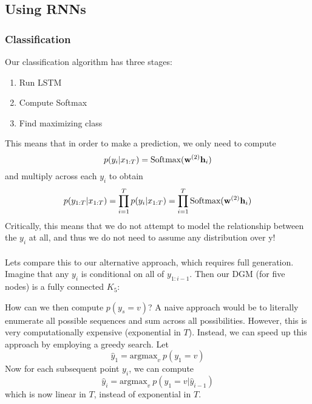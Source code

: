 \documentclass{article}
\begin{document}
\subsection{Using RNNs}
\subsubsection{Classification}
Our classification algorithm has three stages:
\begin{enumerate}
    \item Run LSTM
    \item Compute Softmax   
    \item Find maximizing class
\end{enumerate}


This means that in order to make a prediction, we only need to compute 
$$ p(y_i|x_{1:T}) = \text{Softmax} (\bold{w}^{(2)} \bold{h}_i) $$
and multiply across each $y_i$ to obtain
$$ p(y_{1:T} | x_{1:T}) = \prod_{i=1}^T p(y_i|x_{1:T}) = \prod_{i=1}^T \text{Softmax} (\bold{w}^{(2)} \bold{h}_i) $$ 
Critically, this means that we do not attempt to model the relationship between the $y_i$ at all, and thus we do not need to assume any distribution over y!
\\ \\ \noindent
Lets compare this to our alternative approach, which requires full generation. Imagine that any $y_i$ is conditional on all of $y_{1:i-1}$. Then our DGM (for five nodes) is a fully connected $K_5$:

\begin{center}
\end{center}

How can we then compute $p(y_s = v)$? A naive approach would be to literally enumerate all possible sequences and sum across all possibilities. However, this is very computationally expensive (exponential in $T$). Instead, we can speed up this approach by employing a greedy search. Let $$\hat{y}_1 = \text{argmax}_v \: p(y_1=v)$$
Now for each subsequent point $y_i$, we can compute
$$ \hat{y}_i = \text{argmax}_v \: p(y_1=v|\hat{y}_{i-1})$$
which is now linear in $T$, instead of exponential in $T$.
\end{document}

